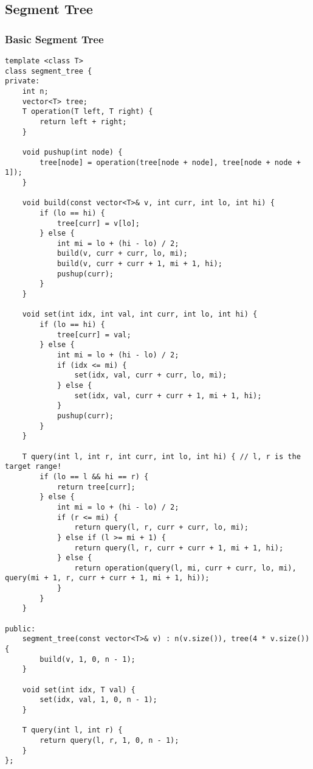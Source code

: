 \subsection{Segment Tree}
\subsubsection{Basic Segment Tree}
\begin{lstlisting}
template <class T>
class segment_tree {
private:
    int n;
    vector<T> tree;
    T operation(T left, T right) {
        return left + right;
    }
 
    void pushup(int node) {
        tree[node] = operation(tree[node + node], tree[node + node + 1]);
    }
 
    void build(const vector<T>& v, int curr, int lo, int hi) {
        if (lo == hi) {
            tree[curr] = v[lo];
        } else {
            int mi = lo + (hi - lo) / 2;
            build(v, curr + curr, lo, mi);
            build(v, curr + curr + 1, mi + 1, hi);
            pushup(curr);
        }
    }
 
    void set(int idx, int val, int curr, int lo, int hi) {
        if (lo == hi) {
            tree[curr] = val;
        } else {
            int mi = lo + (hi - lo) / 2;
            if (idx <= mi) {
                set(idx, val, curr + curr, lo, mi);
            } else {
                set(idx, val, curr + curr + 1, mi + 1, hi);
            }
            pushup(curr);
        }
    }
 
    T query(int l, int r, int curr, int lo, int hi) { // l, r is the target range!
        if (lo == l && hi == r) {
            return tree[curr];
        } else {
            int mi = lo + (hi - lo) / 2;
            if (r <= mi) {
                return query(l, r, curr + curr, lo, mi);
            } else if (l >= mi + 1) {
                return query(l, r, curr + curr + 1, mi + 1, hi);
            } else {
                return operation(query(l, mi, curr + curr, lo, mi), query(mi + 1, r, curr + curr + 1, mi + 1, hi));
            }
        }
    }
 
public:
    segment_tree(const vector<T>& v) : n(v.size()), tree(4 * v.size()) {
        build(v, 1, 0, n - 1);
    }
 
    void set(int idx, T val) {
        set(idx, val, 1, 0, n - 1);
    }
 
    T query(int l, int r) {
        return query(l, r, 1, 0, n - 1);
    }
};
\end{lstlisting}

